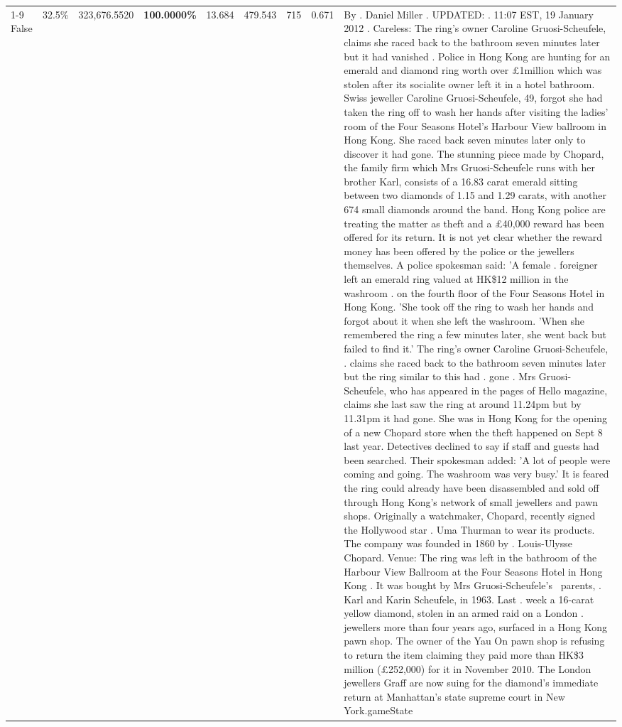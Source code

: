 \begin{table}[H]
\begin{tabular}{lllrlllll}
\cline{1-9}
False & 32.5\% & 323,676.5520 & \bfseries \color{red} 100.0000\% & 13.684 & 479.543 & 715 & 0.671 & By . Daniel Miller . UPDATED: . 11:07 EST, 19 January 2012 . Careless: The ring's owner Caroline Gruosi-Scheufele, claims she raced back to the bathroom seven minutes later but it had vanished . Police in Hong Kong are hunting for an emerald and diamond ring worth over £1million which was stolen after its socialite owner left it in a hotel bathroom. Swiss jeweller Caroline Gruosi-Scheufele, 49, forgot she had taken the ring off to wash her hands after visiting the ladies' room of the Four Seasons Hotel's Harbour View ballroom in Hong Kong. She raced back seven minutes later only to discover it had gone. The stunning piece made by Chopard, the family firm which Mrs Gruosi-Scheufele runs with her brother Karl, consists of a 16.83 carat emerald sitting between two diamonds of 1.15 and 1.29 carats, with another 674 small diamonds around the band. Hong Kong police are treating the matter as theft and a £40,000 reward has been offered for its return. It is not yet clear whether the reward money has been offered by the police or the jewellers themselves. A police spokesman said: 'A female . foreigner left an emerald ring valued at HK\$12 million in the washroom . on the fourth floor of the Four Seasons Hotel in Hong Kong. 'She took off the ring to wash her hands and forgot about it when she left the washroom. 'When she remembered the ring a few minutes later, she went back but failed to find it.' The ring's owner Caroline Gruosi-Scheufele, . claims she raced back to the bathroom seven minutes later but the ring similar to this had . gone . Mrs Gruosi-Scheufele, who has appeared in the pages of Hello magazine, claims she last saw the ring at around 11.24pm but by 11.31pm it had gone. She was in Hong Kong for the opening of a new Chopard store when the theft happened on Sept 8 last year. Detectives declined to say if staff and guests had been searched. Their spokesman added: 'A lot of people were coming and going. The washroom was very busy.' It is feared the ring could already have been disassembled and sold off through Hong Kong's network of small jewellers and pawn shops. Originally a watchmaker, Chopard, recently signed the Hollywood star . Uma Thurman to wear its products. The company was founded in 1860 by . Louis-Ulysse Chopard. Venue: The ring was left in the bathroom of the Harbour View Ballroom at the Four Seasons Hotel in Hong Kong . It was bought by Mrs Gruosi-Scheufele's  parents, . Karl and Karin Scheufele, in 1963. Last . week a 16-carat yellow diamond, stolen in an armed raid on a London . jewellers more than four years ago, surfaced in a Hong Kong pawn shop. The owner of the Yau On pawn shop is refusing to return the item claiming they paid more than HK\$3 million (£252,000) for it in November 2010. The London jewellers Graff are now suing for the diamond’s immediate return at Manhattan’s state supreme court in New York.gameState \\

\end{tabular}
\end{table}
